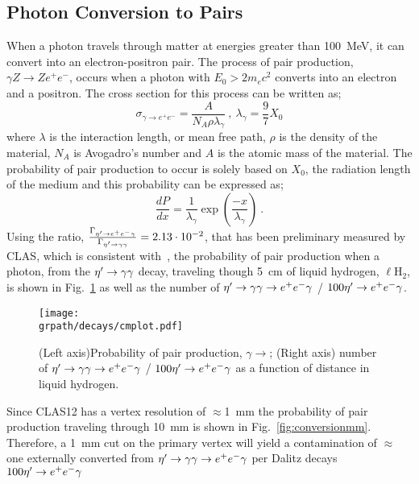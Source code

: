 \subsection{Photon Conversion to \epemT Pairs}\label{sec:intro.conversion}
When a photon travels through matter at energies greater than 100~MeV, it can convert into an electron-positron pair. The process of pair production, $\gamma Z \rightarrow Ze^{+}e^{-}$, occurs when a photon with $E_0 > 2 m_e c^2$ converts into an electron and a positron. The cross section for this process can be written as;
\begin{equation}\label{pair_crosssection}
\sigma_{\gamma\rightarrow e^+e^-} =  \frac{A}{N_{A} \rho \lambda_\gamma}  \ ,\ \lambda_\gamma = \frac{9}{7}X_0
\end{equation}
where $\lambda$ is the interaction length, or mean free path, $\rho$ is the density of the material, $N_A$ is Avogadro's number and $A$ is the atomic mass of the material. The probability of pair production to occur is solely based on $X_{0}$, the radiation length of the medium and this probability can be expressed as;
\begin{equation}
\frac{dP}{dx} = \frac{1}{\lambda_\gamma}\exp(\frac{-x}{\lambda_\gamma}) \ .
\end{equation}
%
%
Using the ratio, $\frac{\Gamma_{\eta^{\prime} \to e^+e^- \gamma}}{\Gamma_{\eta^{\prime} \to \gamma \gamma}} = 2.13\cdot 10^{-2}$, that has been preliminary measured by CLAS, which is consistent with~\cite{BESIII}, the probability of pair production when a photon, from the $\eta^{\prime} \to \gamma \gamma$ decay, traveling though 5~cm of liquid hydrogen, $\ell$H$_2$, is shown in Fig.~\ref{fig:conversion} as well as the number of $\eta^{\prime} \to \gamma \gamma \rightarrow e^+e^- \gamma$ / $100 \eta^{\prime} \rightarrow e^+e^- \gamma$. 
\begin{figure}[h!]\begin{center}
		\texttt{[image: \\grpath/decays/cmplot.pdf]}
		\caption[Probability of pair production, $\gamma \to$\epemT, as a function of distance in liquid hydrogen]{\label{fig:conversion}{(Left axis)Probability of pair production, $\gamma \to$\epemT; (Right axis) number of $\eta^{\prime} \to \gamma \gamma \rightarrow e^+e^- \gamma$ / $100 \eta^{\prime} \rightarrow e^+e^- \gamma$ as a function of distance in liquid hydrogen.}}
	\end{center}\end{figure}
	Since CLAS12 has a vertex resolution of $\approx$1~mm the probability of pair production traveling through 10~mm is shown in Fig.~\ref{fig:conversionmm}. Therefore, a 1~mm cut on the primary vertex will yield a contamination of $\approx$ one externally converted \epemT from $\eta^{\prime} \to \gamma \gamma \rightarrow e^+e^- \gamma$ per Dalitz decays $100 \eta^{\prime} \rightarrow e^+e^- \gamma$
